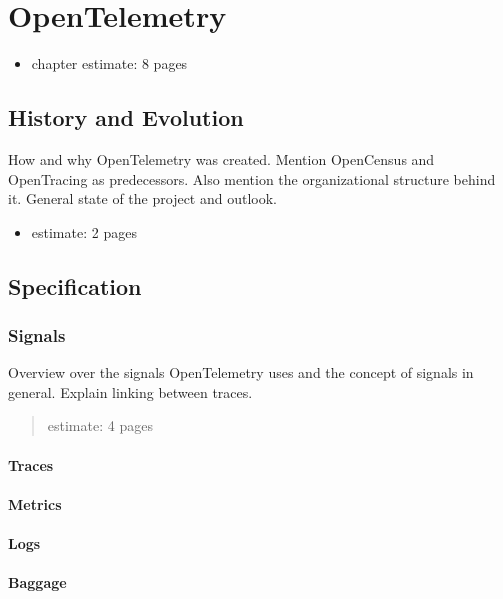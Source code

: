 \chapter{OpenTelemetry}
\label{chap:opentelemetry}

\begin{itemize}
    \item chapter estimate: 8 pages
\end{itemize}

\section{History and Evolution}
\label{sec:o_history_and_evolution}

How and why OpenTelemetry was created. Mention OpenCensus and OpenTracing as predecessors.
Also mention the organizational structure behind it.
General state of the project and outlook.

\begin{itemize}
    \item estimate: 2 pages
\end{itemize}

\section{Specification}
\label{sec:o_specification}

\subsection{Signals}

Overview over the signals OpenTelemetry uses and the concept of signals in general. Explain linking between traces.

\begin{abstract}
    \item estimate: 4 pages
\end{abstract}

\subsubsection{Traces}
\subsubsection{Metrics}
\subsubsection{Logs}
\subsubsection{Baggage}

